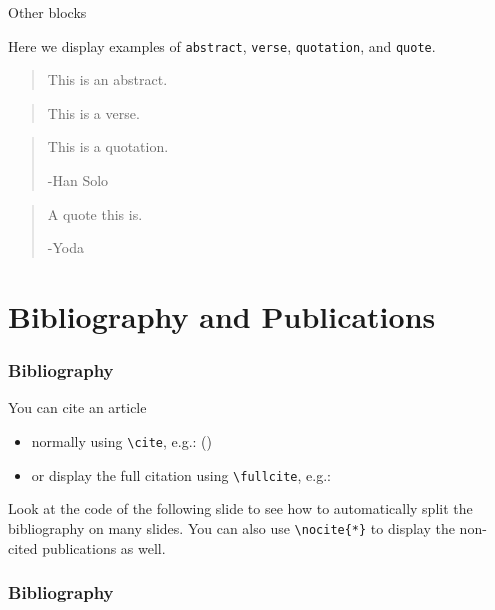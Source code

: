 \documentclass[usenames,dvipsnames]{beamer}
\begin{document}
\begin{frame}{Other blocks}

Here we display examples of \texttt{abstract}, \texttt{verse}, \texttt{quotation}, and \texttt{quote}.

\vskip 0.5cm

\begin{abstract}
This is an abstract.
\end{abstract}
\begin{verse}
This is a verse.
\end{verse}
\begin{quotation}
This is a quotation.

\raggedleft -Han Solo
\end{quotation}
\begin{quote}
A quote this is.

\raggedleft -Yoda
\end{quote}

\end{frame}

\section{Bibliography and Publications}
\begin{frame}[fragile]
\frametitle{Bibliography}

You can cite an article
\begin{itemize}
\item normally using \texttt{\textbackslash cite}, e.g.: (\cite{article1})
\item or display the full citation using \texttt{\textbackslash fullcite}, e.g.:  
\end{itemize}

\vskip 0.5cm
Look at the code of the following slide to see how to automatically split the bibliography on many slides. You can also use \texttt{\textbackslash nocite\{*\}} to display the non-cited publications as well.

\end{frame}

\begin{frame}[t,allowframebreaks]
\frametitle{Bibliography}

\nocite{*} %

\printbibliography

\end{frame}
\end{document}
